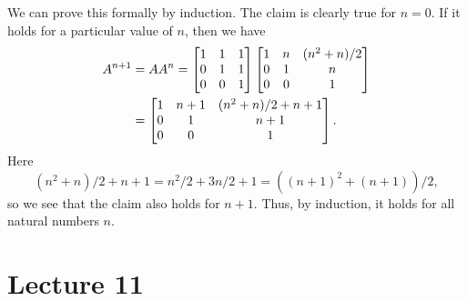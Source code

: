 \documentclass[a4paper]{amsart}
\renewenvironment{solution}{\SolutionInline}{\endSolutionInline}
\begin{document}
\begin{solution}
 We can prove this formally by induction.  The claim is clearly true
 for $n=0$.  If it holds for a particular value of $n$, then we have 
 \begin{align*}
  A^{n+1}
   &= AA^n 
    = \left[\begin{matrix} 1&1&1 \\ 0&1&1 \\ 0&0&1 \end{matrix}\right]
      \left[\begin{matrix} 1 & n & (n^2+n)/2 \\ 0 & 1 & n \\ 0 & 0 & 1 \end{matrix}\right] \\
   &= \left[\begin{matrix} 1 & n+1 & (n^2+n)/2 + n + 1 \\ 0 & 1 & n+1 \\ 0 & 0 & 1 \end{matrix}\right].
 \end{align*}
 Here 
 \[ (n^2+n)/2 + n + 1 = n^2/2 + 3n/2 + 1 = ((n+1)^2+(n+1))/2, \]
 so we see that the claim also holds for $n+1$.  Thus, by induction,
 it holds for all natural numbers $n$.
\end{solution}

\section{Lecture 11}
\end{document}

